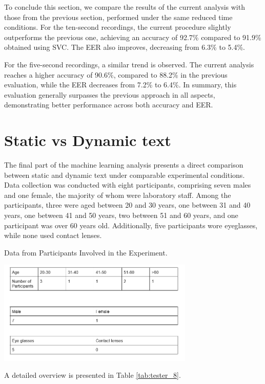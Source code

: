 \documentclass[12pt]{report}
\begin{document}
To conclude this section, we compare the results of the current analysis with those from the previous section, performed under the same reduced time conditions.
For the ten-second recordings, the current procedure slightly outperforms the previous one, achieving an accuracy of 92.7\% compared to 91.9\% obtained using SVC. 
The EER also improves, decreasing from 6.3\% to 5.4\%.

For the five-second recordings, a similar trend is observed. 
The current analysis reaches a higher accuracy of 90.6\%, compared to 88.2\% in the previous evaluation, while the EER decreases from 7.2\% to 6.4\%.
In summary, this evaluation generally surpasses the previous approach in all aspects, demonstrating better performance across both accuracy and EER.

\FloatBarrier

\section{Static vs Dynamic text}
\label{subsec:s_vs_d}

The final part of the machine learning analysis presents a direct comparison between static and dynamic text under comparable experimental conditions.
Data collection was conducted with eight participants, comprising seven males and one female, the majority of whom were laboratory staff.
Among the participants, three were aged between 20 and 30 years, one between 31 and 40 years, one between 41 and 50 years, two between 51 and 60 years, and one participant was over 60 years old.
Additionally, five participants wore eyeglasses, while none used contact lenses.

\begin{table}[ht]
    \centering
    \caption{Data from Participants Involved in the Experiment.}
    \includegraphics[width=0.7\textwidth]{Images/Experiment/static_vs_dynamic.png}
    \label{tab:tester_8}
\end{table}

A detailed overview is presented in Table \ref{tab:tester_8}.
\end{document}
